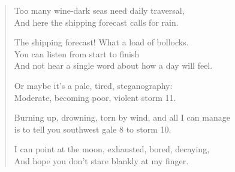 \begin{verse}
  Too many wine-dark seas need daily traversal,\\
  And here the shipping forecast calls for rain.

  The shipping forecast! What a load of bollocks.\\
  You can listen from start to finish\\
  And not hear a single word about how a day will feel.

  Or maybe it's a pale, tired, steganography:\\
  Moderate, becoming poor, violent storm 11.

  Burning up, drowning, torn by wind, and all I can manage\\
  is to tell you southwest gale 8 to storm 10.

  I can point at the moon, exhausted, bored, decaying,\\
  And hope you don't stare blankly at my finger.
\end{verse}
